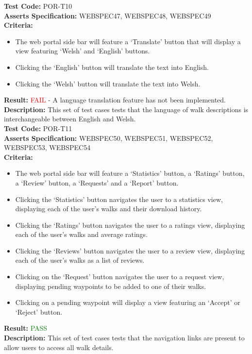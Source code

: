 \documentclass[11pt,a4paper]{report}
\begin{document}
\label{test:POR-T10}
\noindent\textbf{Test Code:} POR-T10\\
\textbf{Asserts Specification:} WEBSPEC47, WEBSPEC48, WEBSPEC49\\ 
\textbf{Criteria:} \begin{itemize}
                     \item The web portal side bar will feature a `Translate' button that will display a view featuring `Welsh' and `English' buttons.
                     \item Clicking the `English' button will translate the text into English.
                     \item Clicking the `Welsh' button will translate the text into Welsh.
                   \end{itemize}  
\textbf{Result:} \textcolor{red}{FAIL} - A language translation feature has not been implemented.\\
\textbf{Description:} This set of test cases tests that the language of walk descriptions is interchangeable between English and Welsh. \\

\label{test:POR-T11}
\noindent\textbf{Test Code:} POR-T11\\
\textbf{Asserts Specification:} WEBSPEC50, WEBSPEC51, WEBSPEC52, WEBSPEC53, WEBSPEC54\\ 
\textbf{Criteria:} \begin{itemize}
                     \item The web portal side bar will feature a `Statistics' button, a `Ratings' button, a `Review' button, a `Requests' and a `Report' button.
                     \item Clicking the `Statistics' button navigates the user to a statistics view, displaying each of the user's walks and their download history.
                     \item Clicking the `Ratings' button navigates the user to a ratings view, displaying each of the user's walks and average ratings.
                     \item Clicking the `Reviews' button navigates the user to a review view, displaying each of the user's walks as a list of reviews.
                     \item Clicking on the `Request' button navigates the user to a request view, displaying pending waypoints to be added to one of their walks.
                     \item Clicking on a pending waypoint will display a view featuring an `Accept' or `Reject' button.
                   \end{itemize}  
\textbf{Result:} \textcolor{green}{PASS}\\
\textbf{Description:} This set of test cases tests that the navigation links are present to allow users to access all walk details. \\
\end{document}
